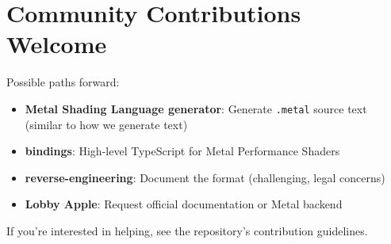 \section{Community Contributions Welcome}

Possible paths forward:
\begin{itemize}[noitemsep]
  \item \textbf{Metal Shading Language generator}: Generate \texttt{.metal} source text (similar to how we generate   text)
  \item \textbf{ bindings}: High-level TypeScript  for Metal Performance Shaders
  \item \textbf{ reverse-engineering}: Document the format (challenging, legal concerns)
  \item \textbf{Lobby Apple}: Request official  documentation or  Metal backend
\end{itemize}

If you're interested in helping, see the repository's contribution guidelines.
